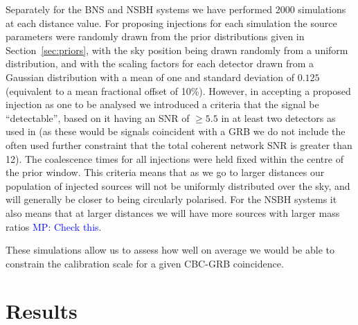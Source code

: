\documentclass[10pt]{iopart}
\newcommand{\MP}[1]{\textcolor{blue}{MP: #1}}
\begin{document}
Separately for the \ac{BNS} and \ac{NSBH} systems we have performed 2000 simulations at each 
distance value. For proposing injections for each simulation the source parameters were randomly 
drawn from the prior distributions given in Section~\ref{sec:priors}, with the sky position being 
drawn randomly from a uniform distribution, and with the scaling factors for each detector drawn 
from a Gaussian distribution with a mean of one and standard deviation of $0.125$ (equivalent to a 
mean fractional offset of 10\%). However, in accepting a proposed injection as one to be analysed 
we introduced a criteria that the signal be ``detectable'', based on it having an SNR of $\geq 5.5$ 
in at least two detectors as used in \cite{2012PhRvD..85h2002A} (as these would be signals 
coincident with a GRB we do not include the often used further constraint that the total coherent 
network SNR is greater than 12). The coalescence times for all injections were held fixed 
within the centre of the prior window. This criteria means that as we go to larger distances our 
population of injected sources will not be uniformly distributed over the sky, and will generally 
be closer to being circularly polarised. For the \ac{NSBH} systems it also means that at larger 
distances we will have more sources with larger mass ratios \MP{Check this}.

These simulations allow us to assess how well on average we would be able to constrain the 
calibration scale for a given CBC-GRB coincidence.



\section{Results}\label{sec:results}
\end{document}
